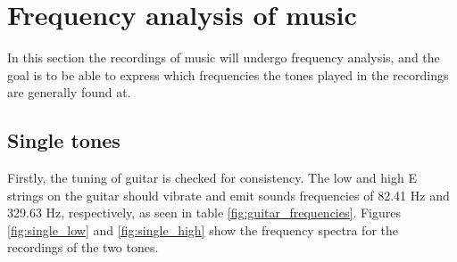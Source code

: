 \section{Frequency analysis of music}
In this section the recordings of music will undergo frequency analysis, and the goal is to be able to express which frequencies the tones played in the recordings are generally found at.
\subsection{Single tones}\label{sec:single}
Firstly, the tuning of guitar is checked for consistency. The low and high E strings on the guitar should vibrate and emit sounds frequencies of 82.41 Hz and 329.63 Hz, respectively, as seen in table \ref{fig:guitar_frequencies}. Figures \ref{fig:single_low} and \ref{fig:single_high} show the frequency spectra for the recordings of the two tones.
